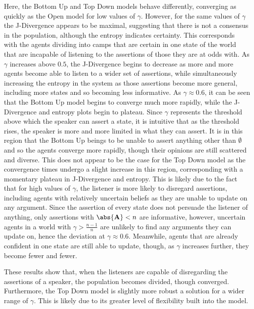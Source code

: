 Here, the Bottom Up and Top Down models behave differently, converging as quickly as the Open model for low values of $\gamma$. However, for the same values of $\gamma$ the J-Divergence appears to be maximal, suggesting that there is not a consensus in the population, although the entropy indicates certainty. This corresponds with the agents dividing into camps that are certain in one state of the world that are incapable of listening to the assertions of those they are at odds with.  As $\gamma$ increases above $0.5$, the J-Divergence begins to decrease as more and more agents become able to listen to a wider set of assertions, while simultaneously increasing the entropy in the system as those assertions become more general, including more states and so becoming less informative. As $\gamma \approx 0.6$, it can be seen that the Bottom Up model begins to converge much more rapidly, while the J-Divergence and entropy plots begin to plateau. Since $\gamma$ represents the threshold above which the speaker can assert a state, it is intuitive that as the threshold rises, the speaker is more and more limited in what they can assert. It is in this region that the Bottom Up beings to be unable to assert anything other than $\emptyset$ and so the agents converge more rapidly, though their opinions are still scattered and diverse. This does not appear to be the case for the Top Down model as the convergence times undergo a slight increase in this region, corresponding with a momentary plateau in J-Divergence and entropy. This is likely due to the fact that for high values of $\gamma$, the listener is more likely to disregard assertions, including agents with relatively uncertain beliefs as they are unable to update on any argument. Since the assertion of every state does not persuade the listener of anything, only assertions with $\abs{\mathbf{A}} < n$ are informative, however, uncertain agents in a world with $\gamma > \frac{n-1}{n}$ are unlikely to find any arguments they can update on, hence the deviation at $\gamma \approx 0.6$. Meanwhile, agents that are already confident in one state are still able to update, though, as $\gamma$ increases further, they become fewer and fewer. 

These results show that, when the listeners are capable of disregarding the assertions of a speaker, the population becomes divided, though converged. Furthermore, the Top Down model is slightly more robust a solution for a wider range of $\gamma$. This is likely due to its greater level of flexibility built into the model. 


